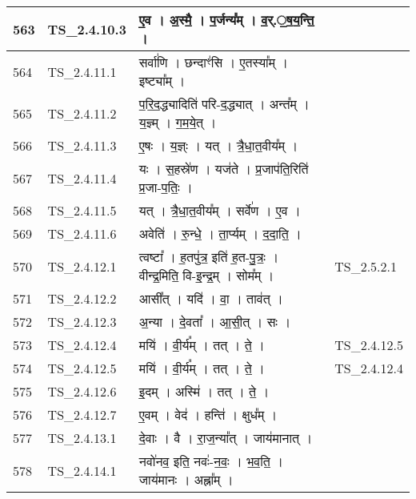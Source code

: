 \documentclass[17pt]{extarticle}
\begin{document}
\begin{longtable}{||p{0.4in}||p{0.9in}||p{4.0in}||p{0.9in}||}
        \hline
            563 & TS\_2.4.10.3 & ए॒व   ।   अ॒स्मै॒   ।   प॒र्जन्य᳚म्   ।   व॒र्.॒ष॒य॒न्ति॒   ।    &      \\
        \hline
            564 & TS\_2.4.11.1 & सर्वा॑णि   ।   छन्दाꣳ॑सि   ।   ए॒तस्या᳚म्   ।   इष्ट्या᳚म्   ।    &      \\
        \hline
            565 & TS\_2.4.11.2 & प॒रि॒द॒द्ध्यादिति॑ परि{-}द॒द्ध्यात्   ।   अन्त᳚म्   ।   य॒ज्ञ्म्   ।   ग॒म॒ये॒त्   ।    &      \\
        \hline
            566 & TS\_2.4.11.3 & ए॒षः   ।   य॒ज्ञ्ः   ।   यत्   ।   त्रै॒धा॒त॒वीय᳚म्   ।    &      \\
        \hline
            567 & TS\_2.4.11.4 & यः   ।   स॒हस्रे॑ण   ।   यज॑ते   ।   प्र॒जाप॑ति॒रिति॑ प्र॒जा{-}प॒तिः॒   ।    &      \\
        \hline
            568 & TS\_2.4.11.5 & यत्   ।   त्रै॒धा॒त॒वीय᳚म्   ।   सर्वे॑ण   ।   ए॒व   ।    &      \\
        \hline
            569 & TS\_2.4.11.6 & अवेति॑   ।   रु॒न्धे॒   ।   ता॒र्प्यम्   ।   द॒दा॒ति॒   ।    &      \\
        \hline
            570 & TS\_2.4.12.1 & त्वष्टा᳚   ।   ह॒तपु॑त्र॒ इति॑ ह॒त{-}पु॒त्रः॒   ।   वीन्द्र॒मिति॒ वि{-}इ॒न्द्र॒म्   ।   सोम᳚म्   ।    &  TS\_2.5.2.1       \\
        \hline
            571 & TS\_2.4.12.2 & आसी᳚त्   ।   यदि॑   ।   वा॒   ।   ताव॑त्   ।    &      \\
        \hline
            572 & TS\_2.4.12.3 & अ॒न्या   ।   दे॒वता᳚   ।   आ॒सी॒त्   ।   सः   ।    &      \\
        \hline
            573 & TS\_2.4.12.4 & मयि॑   ।   वी॒र्य᳚म्   ।   तत्   ।   ते॒   ।    &  TS\_2.4.12.5       \\
        \hline
            574 & TS\_2.4.12.5 & मयि॑   ।   वी॒र्य᳚म्   ।   तत्   ।   ते॒   ।    & TS\_2.4.12.4        \\
        \hline
            575 & TS\_2.4.12.6 & इ॒दम्   ।   अस्मि॑   ।   तत्   ।   ते॒   ।    &      \\
        \hline
            576 & TS\_2.4.12.7 & ए॒वम्   ।   वेद॑   ।   हन्ति॑   ।   क्षुध᳚म्   ।    &      \\
        \hline
            577 & TS\_2.4.13.1 & दे॒वाः   ।   वै   ।   रा॒ज॒न्या᳚त्   ।   जाय॑मानात्   ।    &      \\
        \hline
            578 & TS\_2.4.14.1 & नवो॑नव॒ इति॒ नवः॑{-}न॒वः॒   ।   भ॒व॒ति॒   ।   जाय॑मानः   ।   अह्ना᳚म्   ।    &      \\

\end{longtable}
\end{document}
